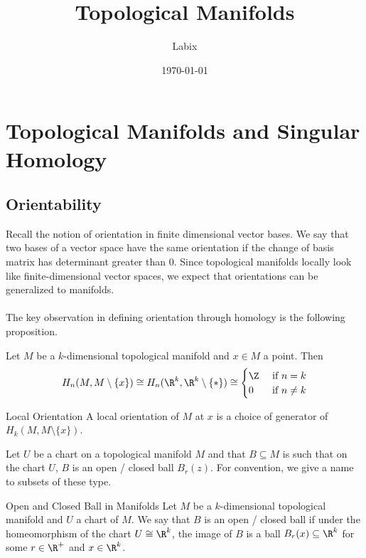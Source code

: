 \documentclass[a4paper]{article}
\title{Topological Manifolds}
\author{Labix}
\date{\today}
\begin{document}
\maketitle
\begin{abstract}
\end{abstract}
\pagebreak
\tableofcontents
\pagebreak

\section{Topological Manifolds and Singular Homology}
\subsection{Orientability}
Recall the notion of orientation in finite dimensional vector bases. We say that two bases of a vector space have the same orientation if the change of basis matrix has determinant greater than $0$. Since topological manifolds locally look like finite-dimensional vector spaces, we expect that orientations can be generalized to manifolds. \\~\\

The key observation in defining orientation through homology is the following proposition. 

\begin{prp}{}{} Let $M$ be a $k$-dimensional topological manifold and $x\in M$ a point. Then $$H_n(M,M\setminus\{x\})\cong H_n(\R^k,\R^k\setminus\{\ast\})\cong\begin{cases}
\Z & \text{ if } n=k\\
0 & \text{ if } n\neq k
\end{cases}$$
\end{prp}

\begin{defn}{Local Orientation}{} A local orientation of $M$ at $x$ is a choice of generator of $H_k(M,M\setminus\{x\})$. 
\end{defn}

Let $U$ be a chart on a topological manifold $M$ and that $B\subseteq M$ is such that on the chart $U$, $B$ is an open / closed ball $B_r(z)$. For convention, we give a name to subsets of these type. 

\begin{defn}{Open and Closed Ball in Manifolds}{} Let $M$ be a $k$-dimensional topological manifold and $U$ a chart of $M$. We say that $B$ is an open / closed ball if under the homeomorphism of the chart $U\cong\R^k$, the image of $B$ is a ball $B_r(x)\subseteq\R^k$ for some $r\in\R^+$ and $x\in\R^k$. 
\end{defn}
\end{document}
